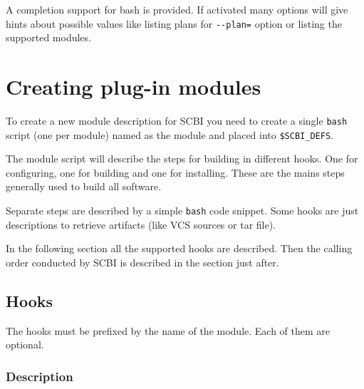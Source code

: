 \documentclass[a4paper,12pt,twoside]{article}
\newcommand{\code}[1]{\texttt{#1}}
\let\stdsection\section
\renewcommand\section{\newpage\stdsection}
\newcommand{\ddash}{-{}-}
\begin{document}
A completion support for bash is provided. If activated many options will give hints about possible values like listing plans for \code{\ddash{}plan=} option or listing the supported modules.


\section{Creating plug-in modules}

To create a new module description for SCBI you need to create a single \code{bash} script (one per module) named as the module and placed into \code{\$SCBI\_DEFS}.

The module script will describe the steps for building in different hooks. One for configuring, one for building and one for installing. These are the mains steps generally used to build all software.

Separate steps are described by a simple \code{bash} code snippet. Some hooks are just descriptions to retrieve artifacts (like VCS sources or tar file).

In the following section all the supported hooks are described. Then the calling order conducted by SCBI is described in the section just after.

\subsection{Hooks}

The hooks must be prefixed by the name of the module. Each of them are optional.

\subsubsection{Description}
\end{document}
